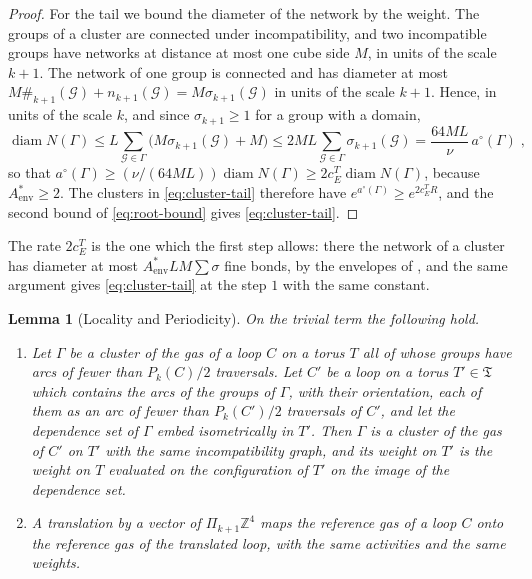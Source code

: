 \documentclass[11pt]{preprint}
\newcommand{\diam}{\operatorname{diam}}
\numberwithin{equation}{section}
\newtheorem{lemma}[theorem]{Lemma}
\theoremstyle{definition}
\theoremstyle{remark}
\theoremstyle{plain}
\begin{document}
\begin{proof}
For the tail we bound the diameter of the network by the weight. The groups of a cluster are connected under incompatibility, and two incompatible groups have networks at distance at most one cube side $M$, in units of the scale $k + 1$. The network of one group is connected and has diameter at most $M\#_{k+1}(\mathcal G) + n_{k+1}(\mathcal G) = M\sigma_{k+1}(\mathcal G)$ in units of the scale $k + 1$. Hence, in units of the scale $k$, and since $\sigma_{k+1} \geq 1$ for a group with a domain,
\begin{equation}\label{eq:network-diameter}
    \diam N(\Gamma) \leq L\sum_{\mathcal G \in \Gamma}\bigl(M\sigma_{k+1}(\mathcal G) + M\bigr) \leq 2ML\sum_{\mathcal G \in \Gamma}\sigma_{k+1}(\mathcal G) = \frac{64ML}{\nu}\,a^\circ(\Gamma)\;,
\end{equation}
so that $a^\circ(\Gamma) \geq (\nu/(64ML))\diam N(\Gamma) \geq 2c^T_E\diam N(\Gamma)$, because $A^*_{\mathrm{env}} \geq 2$. The clusters in \eqref{eq:cluster-tail} therefore have $e^{a^\circ(\Gamma)} \geq e^{2c^T_ER}$, and the second bound of \eqref{eq:root-bound} gives \eqref{eq:cluster-tail}.
\end{proof}

The rate $2c^T_E$ is the one which the first step allows: there the network of a cluster has diameter at most $A^*_{\mathrm{env}}LM\sum\sigma$ fine bonds, by the envelopes of \cite[Lemma~E.8]{WilsonFirstStep}, and the same argument gives \eqref{eq:cluster-tail} at the step $1$ with the same constant.

\begin{lemma}[Locality and Periodicity]\label{lem:locality}
On the trivial term the following hold.
\begin{enumerate}[label=(\roman*)]
\item Let $\Gamma$ be a cluster of the gas of a loop $C$ on a torus $T$ all of whose groups have arcs of fewer than $P_k(C)/2$ traversals. Let $C'$ be a loop on a torus $T' \in \mathfrak T$ which contains the arcs of the groups of $\Gamma$, with their orientation, each of them as an arc of fewer than $P_k(C')/2$ traversals of $C'$, and let the dependence set of $\Gamma$ embed isometrically in $T'$. Then $\Gamma$ is a cluster of the gas of $C'$ on $T'$ with the same incompatibility graph, and its weight on $T'$ is the weight on $T$ evaluated on the configuration of $T'$ on the image of the dependence set.
\item A translation by a vector of $\Pi_{k+1}\mathbb Z^4$ maps the reference gas of a loop $C$ onto the reference gas of the translated loop, with the same activities and the same weights.
\end{enumerate}
\end{lemma}
\end{document}
